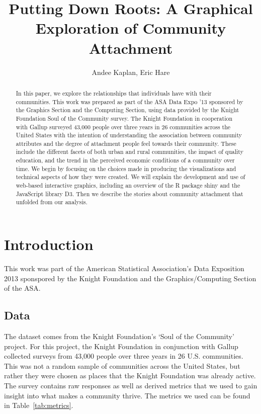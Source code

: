 \documentclass[11pt]{article}\usepackage{knitr}
\begin{document}
\setlength{\parskip}{3ex}
\setlength{\parindent}{0pt}

\title{Putting Down Roots: A Graphical Exploration of Community Attachment}
\author{Andee Kaplan, Eric Hare}

\maketitle

\begin{abstract}
In this paper, we explore the relationships that individuals have with their communities. This work was prepared as part of the ASA Data Expo ’13 sponsored by the Graphics Section and the Computing Section, using data provided by the Knight Foundation Soul of the Community survey. The Knight Foundation in cooperation with Gallup surveyed 43,000 people over three years in 26 communities across the United States with the intention of understanding the association between community attributes and the degree of attachment people feel towards their community. These include the different facets of both urban and rural communities, the impact of quality education, and the trend in the perceived economic conditions of a community over time. We begin by focusing on the choices made in producing the visualizations and technical aspects of how they were created. We will explain the development and use of web-based interactive graphics, including an overview of the R package shiny and the JavaScript library D3. Then we describe the stories about community attachment that unfolded from our analysis.
\end{abstract}

\clearpage

\setcounter{page}{1}
\section*{Introduction}

This work was part of the American Statistical Association's Data Exposition 2013 sponspored by the Knight Foundation and the Graphics/Computing Section of the ASA.

\subsection*{Data}
The dataset comes from the Knight Foundation's `Soul of the Community' project. For this project, the Knight Foundation in conjunction with Gallup collected surveys from 43,000 people over three years in 26 U.S. communities. This was not a random sample of communities across the United States, but rather they were chosen as places that the Knight Foundation was already active. The survey contains raw responses as well as derived metrics that we used to gain insight into what makes a community thrive. The metrics we used can be found in Table~\ref{tab:metrics}.
\end{document}
